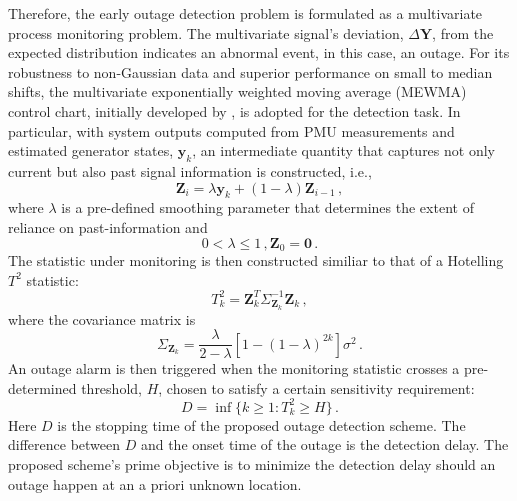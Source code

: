 Therefore, the early outage detection problem is formulated as a multivariate process monitoring problem. The multivariate signal's deviation, $\Delta \boldsymbol{Y}$, from the expected distribution indicates an abnormal event, in this case, an outage. For its robustness to non-Gaussian data and superior performance on small to median shifts, the multivariate exponentially weighted moving average (MEWMA) control chart, initially developed by \cite{lowry1992multivariate}, is adopted for the detection task. In particular, with system outputs computed from PMU measurements and estimated generator states, $\boldsymbol{y}_k$, an intermediate quantity that captures not only current but also past signal information is constructed, i.e.,
\begin{equation}
\label{ch4:eqn:ewma_z}
\boldsymbol{Z}_i = \lambda \boldsymbol{y}_k + (1 - \lambda) \boldsymbol{Z}_{i-1} \,,
\end{equation}
where $\lambda$ is a pre-defined smoothing parameter that determines the extent of reliance on past-information and 
$$
0<\lambda \le 1 \,, \boldsymbol{Z}_0 = \mathbf{0} \,.
$$
The statistic under monitoring is then constructed similiar to that of a Hotelling $T^2$ statistic:
\begin{equation}
\label{ch4:eqn:ewma_T}
T^2_k = \boldsymbol{Z}_k^T\Sigma_{\boldsymbol{Z}_k}^{-1}\boldsymbol{Z}_k \,,
\end{equation}
where the covariance matrix is 
$$
\Sigma_{\boldsymbol{Z}_k} = \frac{\lambda}{2 - \lambda}\left[1-(1-\lambda)^{2k}\right]\sigma^2 \,.
$$
An outage alarm is then triggered when the monitoring statistic crosses a pre-determined threshold, $H$, chosen to satisfy a certain sensitivity requirement:
\begin{equation}
\label{ch4:eqn:control_chart}
D = \inf\lbrace k\ge1 : T^2_k \ge H \rbrace \,.
\end{equation}
Here $D$ is the stopping time of the proposed outage detection scheme. The difference between $D$ and the onset time of the outage is the detection delay. The proposed scheme's prime objective is to minimize the detection delay should an outage happen at an a priori unknown location.

